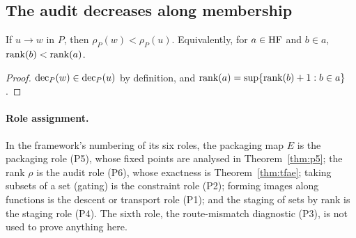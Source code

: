 \subsection{The audit decreases along membership}

\begin{lemma}\label{lem:L3}
If $u\to w$ in $P$, then $\rho_P(w)<\rho_P(u)$. Equivalently, for $a\in\mathrm{HF}$ and $b\in a$,
$\operatorname{rank}(b)<\operatorname{rank}(a)$.
\end{lemma}

\begin{proof}
$\operatorname{dec}_P(w)\in\operatorname{dec}_P(u)$ by definition, and $\operatorname{rank}(a)=\sup\{\operatorname{rank}(b)+1: b\in a\}$.
\end{proof}

\paragraph{Role assignment.} In the framework's numbering of its six roles, the packaging map
$E$ is the packaging role (P5), whose fixed points are analysed in Theorem~\ref{thm:p5}; the rank
$\rho$ is the audit role (P6), whose exactness is Theorem~\ref{thm:tfae}; taking subsets of a
set (gating) is the constraint role (P2); forming images along functions is the descent or
transport role (P1); and the staging of sets by rank is the staging role (P4). The sixth role,
the route-mismatch diagnostic (P3), is not used to prove anything here.
